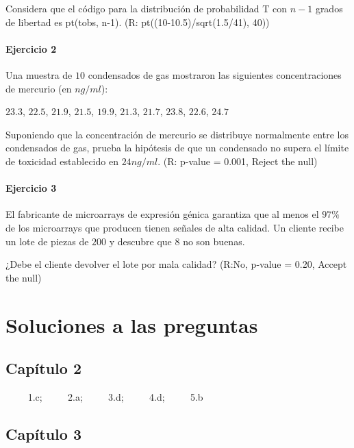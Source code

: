 \documentclass[
]{book}
\begin{document}
Considera que el código para la distribución de probabilidad T con \(n-1\) grados de libertad es pt(tobs, n-1). (R: pt((10-10.5)/sqrt(1.5/41), 40))

\hypertarget{ejercicio-2-12}{%
\subsubsection{Ejercicio 2}\label{ejercicio-2-12}}

Una muestra de \(10\) condensados de gas mostraron las siguientes concentraciones de mercurio (en \(ng/ml\)):

\(23.3\), \(22.5\), \(21.9\), \(21.5\), \(19.9\), \(21.3\), \(21.7\), \(23.8\), \(22.6\), \(24.7\)

Suponiendo que la concentración de mercurio se distribuye normalmente entre los condensados de gas, prueba la hipótesis de que un condensado no supera el límite de toxicidad establecido en \(24 ng/ml\). (R: p-value = 0.001, Reject the null)

\hypertarget{ejercicio-3-9}{%
\subsubsection{Ejercicio 3}\label{ejercicio-3-9}}

El fabricante de microarrays de expresión génica garantiza que al menos el \(97\%\) de los microarrays que producen tienen señales de alta calidad. Un cliente recibe un lote de piezas de \(200\) y descubre que \(8\) no son buenas.

¿Debe el cliente devolver el lote por mala calidad? (R:No, p-value = 0.20, Accept the null)

\hypertarget{soluciones-a-las-preguntas}{%
\chapter{Soluciones a las preguntas}\label{soluciones-a-las-preguntas}}

\hypertarget{capuxedtulo-2}{%
\section{Capítulo 2}\label{capuxedtulo-2}}

\(\qquad\) 1.c; \(\qquad\) 2.a; \(\qquad\) 3.d; \(\qquad\) 4.d; \(\qquad\) 5.b

\hypertarget{capuxedtulo-3}{%
\section{Capítulo 3}\label{capuxedtulo-3}}
\end{document}
